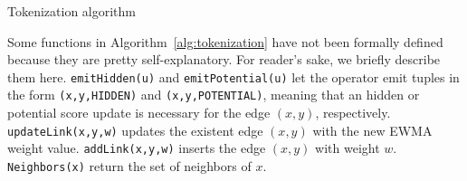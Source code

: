 \lipsum[1]

\begin{algorithm}[t]
	
	 {
		
		
		
		
		
	}
	
	\caption{Tokenization algorithm}
	\label{alg:tokenization}
\end{algorithm}

Some functions in Algorithm~\ref{alg:tokenization} have not been formally defined because they are pretty self-explanatory. 
For reader's sake, we briefly describe them here. \texttt{emitHidden(u)} and \texttt{emitPotential(u)} let the operator emit tuples in the form \texttt{(x,y,HIDDEN)} and \texttt{(x,y,POTENTIAL)}, meaning that an hidden or potential score update is necessary for the edge $(x,y)$, respectively.
\texttt{updateLink(x,y,w)} updates the existent edge $(x,y)$ with the new EWMA weight value. 
\texttt{addLink(x,y,w)} inserts the edge $(x,y)$ with weight $w$. 
\texttt{Neighbors(x)} return the set of neighbors of $x$.